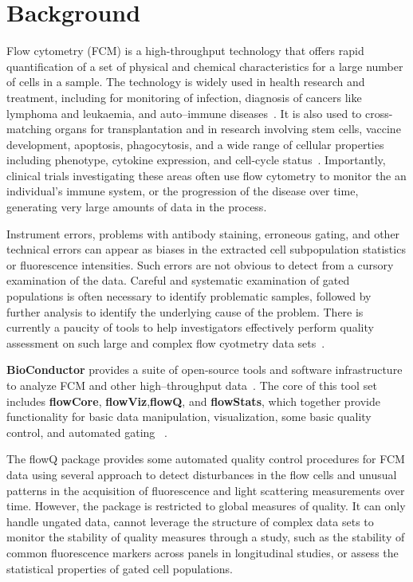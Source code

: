 \documentclass[10pt]{bmc_article}
\newenvironment{bmcformat}{\baselineskip20pt\sloppy\setboolean{publ}{false}}{\baselineskip20pt\sloppy}
\begin{document}
\begin{bmcformat}
\section*{Background}
Flow cytometry (FCM) is a high-throughput technology that offers rapid quantification of a set of physical and 
chemical characteristics for a large number of cells in a sample. The technology is widely used in health research and 
treatment, including for monitoring of infection, diagnosis of cancers like lymphoma and leukaemia, and auto--immune diseases~\cite{Braylan2004, Hengel2001, Illoh2004,Kiechle2003, Mandy2004, Orfao2004, Bagwell2004, Keeney2004, Bashashati:2009em}.  It is also used to cross-matching organs for transplantation and in research involving stem cells, vaccine development, apoptosis, phagocytosis, and a wide range of cellular properties 
including phenotype, cytokine expression, and cell-cycle status~\cite{Krutzik2004, Maecker2002, Pozarowski2004, Pala2000,Vermes2000, Lehmann2000}.
Importantly, clinical trials investigating these areas often use flow cytometry to monitor the an individual's immune system, or the progression of the disease over time, generating very large amounts of data in the process. 

Instrument errors, problems with antibody staining, erroneous gating, and other technical errors can appear as biases in the extracted cell subpopulation statistics or fluorescence intensities. Such errors are not obvious to detect from a cursory examination of the data. Careful and systematic examination of gated populations is often necessary to identify problematic samples, followed by further analysis to identify the underlying cause of the problem.
There is currently a paucity of tools to help investigators effectively perform quality assessment on such large and complex flow cyotmetry data sets~\cite{Shulman:2008jv, Hahne2008}.

\textbf{BioConductor} provides a suite of open-source tools and software infrastructure to analyze FCM and other high--throughput data~\cite{Gentleman2004, Hahne2008}.  The core of this tool set includes \textbf{flowCore}, \textbf{flowViz},\textbf{flowQ}, and \textbf{flowStats}, which together provide functionality for basic data manipulation, visualization, some basic quality control, and automated gating~ \cite{Hahne2008, Hahne:2010uh, Sarkar2008}.

The flowQ package provides some automated quality control procedures for FCM data using several approach to detect disturbances in the flow cells and unusual patterns in the acquisition of fluorescence and light scattering measurements over time\cite{Bashashati2009}. However, the package is restricted to global measures of quality. It can only handle ungated data, cannot leverage the structure of complex data sets to monitor the stability of quality measures through a study, such as the stability of common fluorescence markers across panels in longitudinal studies, or assess the statistical properties of gated cell populations. 


\end{bmcformat}
\end{document}
